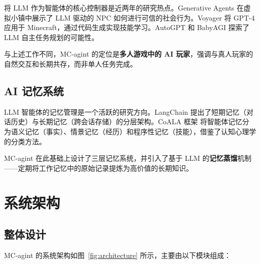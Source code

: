 \documentclass[12pt,a4paper]{article}
\begin{document}
将 LLM 作为智能体的核心控制器是近两年的研究热点。Generative Agents\cite{park2023generative} 在虚拟小镇中展示了 LLM 驱动的 NPC 如何进行可信的社会行为。Voyager\cite{wang2023voyager} 将 GPT-4 应用于 Minecraft，通过代码生成实现技能学习。AutoGPT\cite{autogpt2023} 和 BabyAGI\cite{babyagi2023} 探索了 LLM 自主任务规划的可能性。

与上述工作不同，MC-agint 的定位是\textbf{多人游戏中的 AI 玩家}，强调与真人玩家的自然交互和长期共存，而非单人任务完成。

\subsection{AI 记忆系统}

LLM 智能体的记忆管理是一个活跃的研究方向。LangChain\cite{langchain2023} 提出了短期记忆（对话历史）与长期记忆（跨会话存储）的分层架构。CoALA 框架\cite{coala2023} 将智能体记忆分为语义记忆（事实）、情景记忆（经历）和程序性记忆（技能），借鉴了认知心理学的分类方法。

MC-agint 在此基础上设计了三层记忆系统，并引入了基于 LLM 的\textbf{记忆蒸馏}机制——定期将工作记忆中的原始记录提炼为高价值的长期知识。

\section{系统架构}

\subsection{整体设计}

MC-agint 的系统架构如图~\ref{fig:architecture} 所示，主要由以下模块组成：
\end{document}
